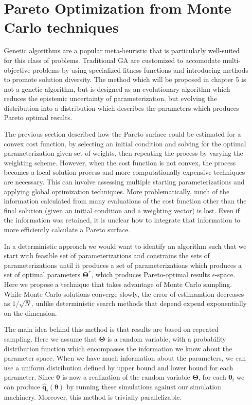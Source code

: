 \section{Pareto Optimization from Monte Carlo techniques}

Genetic algorithms are a popular meta-heuristic that is particularly well-suited for this class of problems.  Traditional GA are customized to accomodate multi-objective problems by using specialized fitness functions and introducing methods to promote solution diversity.  The method which will be proposed in chapter 5 is not a genetic algorithm, but is designed as an evolutionary algorithm which reduces the epistemic uncertainty of parameterization, but evolving the distribution into a distribution  which describes the parameters which produces Pareto optimal results.

The previous section described how the Pareto surface could be estimated for a convex cost function, by selecting an initial condition and solving for the optimal parameterization given set of weights, then repeating the process by varying the weighting scheme.  However, when the cost function is not convex, the process becomes a local solution process and more computationally expensive techniques are necessary.  This can involve assessing multiple starting parameterizations and applying global optimization techniques.  More problematically, much of the information calculated from many evaluations of the cost function other than the final solution (given an initial condition and a weighting vector) is lost.  Even if the information was retained, it is unclear how to integrate that information to more efficiently calculate a Pareto surface.

In a deterministic approach we would want to identify an algorithm such that we start with feasible set of parameterizations and constrains the sets of parameterizations until it produces a set of parameterizations which produces a set of optimal parameters $\bm{\Theta}^*$, which produces Pareto-optimal results $\epsilon$-space.  Here we propose a technique that takes advantage of Monte Carlo sampling.  While Monte Carlo solutions converge slowly, the error of estimamtion decreases as $1/\sqrt{N}$, unlike deterministic search methods that depend expend exponentially on the dimension\cite{caflisch1998_mc}.

The main idea behind this method is that results are based on repeated sampling.  Here we assume that $\bm{\Theta}$ is a random variable, with a probability distribution function which encompasses the information we know about the parameter space.  When we have much information about the parameters, we can use a uniform distribution defined by upper bound and lower bound for each parameter.  Since $\bm{\theta}$ is now a realization of the random variable $\bm{\Theta}$, for each $\bm{\theta}_i$ we can produce $\hat{\bm{q}}_i(\bm{\theta})$ by running these simulations against our simulation machinery.  Moreover, this method is trivially parallelizable.

